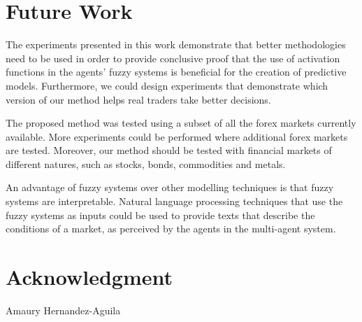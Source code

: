 \documentclass{ieeeaccess}
\begin{document}
\section{Future Work}
\label{section:future-work}

The experiments presented in this work demonstrate that better
methodologies need to be used in order to provide conclusive proof
that the use of activation functions in the agents' fuzzy systems is
beneficial for the creation of predictive models. Furthermore, we
could design experiments that demonstrate which version of our method
helps real traders take better decisions.

The proposed method was tested using a subset of all the forex markets
currently available. More experiments could be performed where
additional forex markets are tested. Moreover, our method should be
tested with financial markets of different natures, such as stocks,
bonds, commodities and metals.

An advantage of fuzzy systems over other modelling techniques is that
fuzzy systems are interpretable. Natural language processing
techniques that use the fuzzy systems as inputs could be used to
provide texts that describe the conditions of a market, as perceived
by the agents in the multi-agent system.



\section*{Acknowledgment}

\begin{IEEEbiography}{Amaury
  Hernandez-Aguila} 
\end{IEEEbiography}




\EOD
\end{document}
